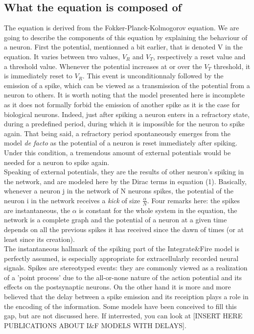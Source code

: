 \subsection{What the equation is composed of}
	The equation is derived from the Fokker-Planck-Kolmogorov equation. We are going to describe the components of this equation by explaining the behaviour of a neuron. First the potential, mentionned a bit earlier, that is denoted V in the equation. It varies between two values, $V_R$ and $V_T$, respectively a reset value and a threshold value. Whenever the potential increases at or over the $V_T$ threshold, it is immediately reset to $V_R$. This event is unconditionnaly followed by the emission of a spike, which can be viewed as a transmission of the potential from a neuron to others. It is worth noting that the model presented here is incomplete as it does not formally forbid the emission of another spike as it is the case for biological neurons. Indeed, just after spiking a neuron enters in a refractory state, during a predefined period, during which it is impossible for the neuron to spike again. That being said, a refractory period spontaneously emerges from the model \emph{de facto} as the potential of a neuron is reset immediately after spiking. Under this condition, a tremendous amount of external potentials would be needed for a neuron to spike again.\\
	Speaking of external potentials, they are the results of other neuron's spiking in the network, and are modeled here by the Dirac terms in equation (1). Basically, whenever a neuron j in the network of N neurons spikes, the potential of the neuron i in the network receives a \emph{kick} of size $\frac{\alpha}{N}$. Four remarks here: the spikes are instantaneous, the $\alpha$ is constant for the whole system in the equation, the network is a complete graph and the potential of a neuron at a given time depends on all the previous spikes it has received since the dawn of times (or at least since its creation).\\
	The instantaneous hallmark of the spiking part of the Integrate\&Fire model is perfectly assumed, is especially appropriate for extracellularly recorded neural signals. Spikes are stereotyped events: they are commonly viewed as a realization of a 'point process' due to the all-or-none nature of the action potential and its effects on the postsynaptic neurons. On the other hand it is more and more believed that the delay between a spike emission and its receiption plays a role in the encoding of the information. Some models have been conceived to fill this gap, but are not discussed here. If interrested, you can look at [INSERT HERE PUBLICATIONS ABOUT I\&F MODELS WITH DELAYS].\\
